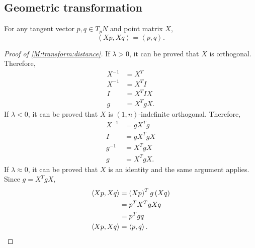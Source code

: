 \documentclass[../methodology.tex]{subfiles}
\begin{document}
\subsection{Geometric transformation}
\begin{lemma}\label{M:transform:distance}
    For any tangent vector \(p,q\in T_p N\)
    and point matrix \(X\),
    \begin{equation*}
        \left\langle Xp, Xq\right\rangle = \left\langle p, q\right\rangle
        \text{.}
    \end{equation*}
    \[
    \]
\end{lemma}
\begin{proof}[Proof of \cref{M:transform:distance}]
    If \(\lambda>0\), it can be proved that \(X\) is orthogonal.
    Therefore,
    \begin{align*}
        X^{-1} & =X^T           \\
        X^{-1} & =X^TI          \\
        I      & =X^TIX         \\
        g      & =X^TgX\text{.}
    \end{align*}
    If \(\lambda<0\), it can be proved that \(X\) is \((1,n)\)-indefinite orthogonal.
    Therefore,
    \begin{align*}
        X^{-1} & =gX^Tg         \\
        I      & =gX^TgX        \\
        g^{-1} & =X^TgX         \\
        g      & =X^TgX\text{.}
    \end{align*}
    If \(\lambda\approx 0\), it can be proved that \(X\) is an identity and the same argument applies.
    Since \(g=X^TgX\),
    \begin{align*}
        \left\langle Xp, Xq\right\rangle
         & = \left(Xp\right)^Tg\left(Xq\right)      \\
         & = p^TX^TgXq                              \\
         & = p^Tgq                                  \\
        \left\langle Xp, Xq\right\rangle
         & = \left\langle p, q\right\rangle\text{.}
        \qedhere
    \end{align*}
\end{proof}
\end{document}
